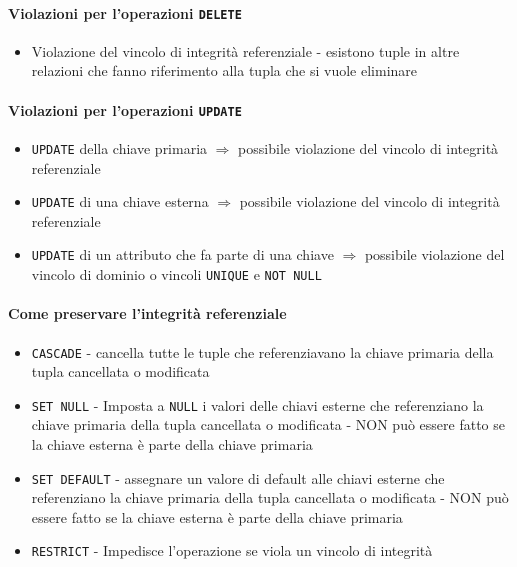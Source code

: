             \paragraph{Violazioni per l'operazioni \texttt{DELETE}}
                \begin{itemize}
                    \item Violazione del vincolo di integrità referenziale - esistono tuple in altre relazioni che fanno riferimento alla tupla che si vuole eliminare
                \end{itemize}
            \paragraph{Violazioni per l'operazioni \texttt{UPDATE}}
                \begin{itemize}
                    \item \texttt{UPDATE} della chiave primaria $\Rightarrow $ possibile violazione del vincolo di integrità referenziale
                    \item \texttt{UPDATE} di una chiave esterna $\Rightarrow $ possibile violazione del vincolo di integrità referenziale
                    \item \texttt{UPDATE} di un attributo che fa parte di una chiave $\Rightarrow $ possibile violazione del vincolo di dominio o vincoli \texttt{UNIQUE} e \texttt{NOT NULL}
                \end{itemize}
            \paragraph{Come preservare l'integrità referenziale}
                \begin{itemize}
                    \item \texttt{CASCADE} - cancella tutte le tuple che referenziavano la chiave primaria della tupla cancellata o modificata
                    \item \texttt{SET NULL} - Imposta a \texttt{NULL} i valori delle chiavi esterne che referenziano la chiave primaria della tupla cancellata o modificata - NON può essere fatto se la chiave esterna è parte della chiave primaria
                    \item \texttt{SET DEFAULT} - assegnare un valore di default alle chiavi esterne che referenziano la chiave primaria della tupla cancellata o modificata - NON può essere fatto se la chiave esterna è parte della chiave primaria
                    \item \texttt{RESTRICT} - Impedisce l'operazione se viola un vincolo di integrità
                \end{itemize}